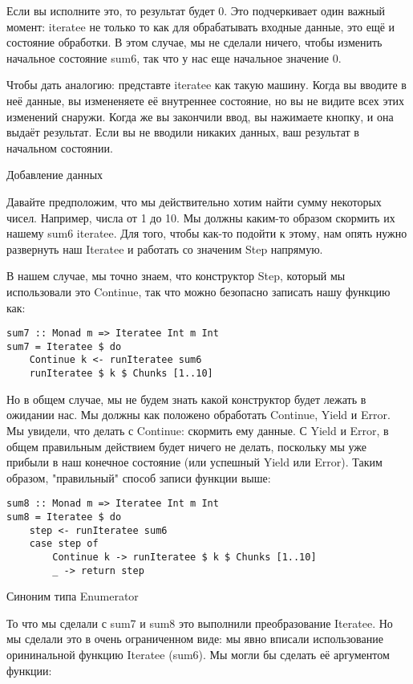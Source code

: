 Если вы исполните это, то результат будет 0. Это подчеркивает один важный момент: iteratee не только то как для обрабатывать входные данные, это ещё и состояние обработки. В этом случае, мы не сделали ничего, чтобы изменить начальное состояние sum6, так что у нас еще начальное значение 0.

Чтобы дать аналогию: представте iteratee как такую машину. Когда вы вводите в неё данные, вы измененяете её внутреннее состояние, но вы не видите всех этих изменений снаружи. Когда же вы закончили ввод, вы нажимаете кнопку, и она выдаёт результат. Если вы не вводили никаких данных, ваш результат в начальном состоянии.

Добавление данных

Давайте предположим, что мы действительно хотим найти сумму некоторых чисел. Например, числа от 1 до 10. Мы должны каким-то образом скормить их нашему sum6 iteratee. Для того, чтобы как-то подойти к этому, нам опять нужно развернуть наш Iteratee и работать со значеним Step напрямую.

В нашем случае, мы точно знаем, что конструктор Step, который мы использовали это Continue, так что можно безопасно записать нашу функцию как:

\begin{lstlisting}
sum7 :: Monad m => Iteratee Int m Int
sum7 = Iteratee $ do
    Continue k <- runIteratee sum6
    runIteratee $ k $ Chunks [1..10]
\end{lstlisting}

Но в общем случае, мы не будем знать какой конструктор будет лежать в ожидании нас. Мы должны как положено обработать Continue, Yield и Error. Мы увидели, что делать с Continue: скормить ему данные. С Yield и Error, в общем правильным действием будет ничего не делать, поскольку мы уже прибыли в наш конечное состояние (или успешный Yield или Error). Таким образом, "правильный" способ записи функции выше:

\begin{lstlisting}
sum8 :: Monad m => Iteratee Int m Int
sum8 = Iteratee $ do
    step <- runIteratee sum6
    case step of
        Continue k -> runIteratee $ k $ Chunks [1..10]
        _ -> return step
\end{lstlisting}

Синоним типа Enumerator

То что мы сделали с sum7 и sum8 это выполнили преобразование Iteratee. Но мы сделали это в очень ограниченном виде: мы явно вписали использование орининальной функцию Iteratee (sum6). Мы могли бы сделать её аргументом функции:

